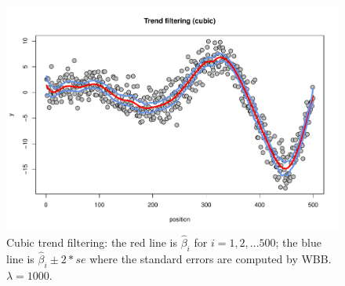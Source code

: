 \documentclass[12pt]{TD-CJS}
\begin{document}
\begin{figure}[ht]
\centering 
\includegraphics[scale=0.55]{filtering.pdf} 
\caption{Cubic trend filtering: the red line is $\hat\beta_i$ for $i=1,2,...500$; the blue line is $\hat\beta_i \pm 2*se$ where the standard errors are computed by WBB. $\lambda = 1000$.}
\label{filter}
\end{figure}
\end{document}
